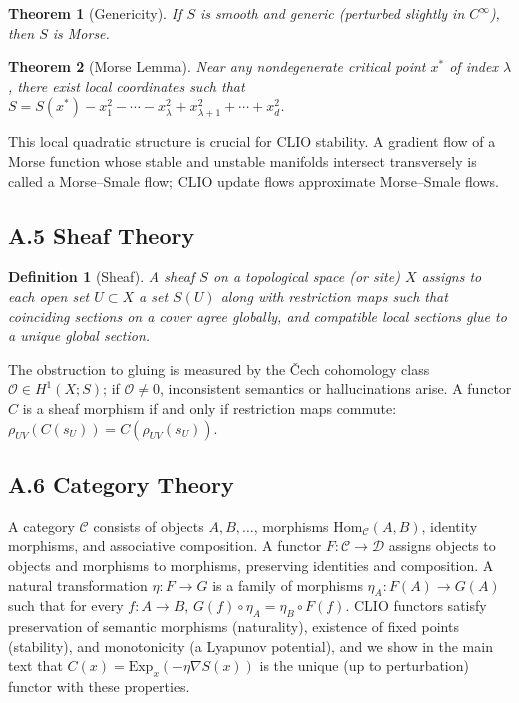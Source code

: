\documentclass[11pt,a4paper,twocolumn]{article}
\newtheorem*{theorem*}{Theorem}
\newtheorem*{definition*}{Definition}
\begin{document}
\begin{theorem*}[Genericity]
If $S$ is smooth and generic (perturbed slightly in $C^\infty$),
then $S$ is Morse.
\end{theorem*}

\begin{theorem*}[Morse Lemma]
Near any nondegenerate critical point $x^\ast$ of index $\lambda$,
there exist local coordinates such that
$S = S(x^\ast) - x_1^2 - \cdots - x_\lambda^2 + x_{\lambda+1}^2 + \cdots + x_d^2$.
\end{theorem*}

This local quadratic structure is crucial for CLIO stability. A
gradient flow of a Morse function whose stable and unstable manifolds
intersect transversely is called a Morse--Smale flow; CLIO update
flows approximate Morse--Smale flows.

\subsection*{A.5 Sheaf Theory}

\begin{definition*}[Sheaf]
A sheaf $S$ on a topological space (or site) $X$ assigns to each open
set $U \subset X$ a set $S(U)$ along with restriction maps such that
coinciding sections on a cover agree globally, and compatible local
sections glue to a unique global section.
\end{definition*}

The obstruction to gluing is measured by the Čech cohomology class
$\mathcal{O} \in H^1(X; S)$; if $\mathcal{O} \ne 0$, inconsistent
semantics or hallucinations arise. A functor $C$ is a sheaf morphism if
and only if restriction maps commute: $\rho_{UV}(C(s_U)) =
C(\rho_{UV}(s_U))$.

\subsection*{A.6 Category Theory}

A category $\mathcal{C}$ consists of objects $A,B,\ldots$, morphisms
$\mathrm{Hom}_{\mathcal{C}}(A,B)$, identity morphisms, and associative
composition. A functor $F : \mathcal{C} \to \mathcal{D}$ assigns
objects to objects and morphisms to morphisms, preserving identities and
composition. A natural transformation $\eta : F \to G$ is a family of
morphisms $\eta_A : F(A) \to G(A)$ such that for every $f : A \to B$,
$G(f) \circ \eta_A = \eta_B \circ F(f)$. CLIO functors satisfy
preservation of semantic morphisms (naturality), existence of fixed
points (stability), and monotonicity (a Lyapunov potential), and we show
in the main text that $C(x) = \mathrm{Exp}_x(-\eta\nabla S(x))$ is
the unique (up to perturbation) functor with these properties.
\end{document}
